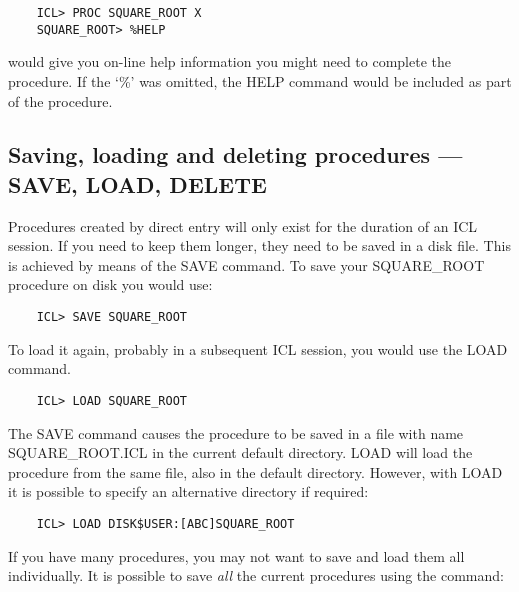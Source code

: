 \begin{small}
\begin{verbatim}
    ICL> PROC SQUARE_ROOT X
    SQUARE_ROOT> %HELP
\end{verbatim}
\end{small}

would give you on-line help information you might need to complete the
procedure.
If the `\%' was omitted, the HELP command would be included as part of the
procedure.

\subsection{Saving, loading and deleting procedures --- SAVE, LOAD, DELETE}

Procedures created by direct entry will only exist for the duration of an ICL
session.
If you need to keep them longer, they need to be saved in a disk file.
This is achieved by means of the SAVE command.
To save your SQUARE\_ROOT procedure on disk you would use:

\begin{small}
\begin{verbatim}
    ICL> SAVE SQUARE_ROOT
\end{verbatim}
\end{small}

To load it again, probably in a subsequent ICL session, you would use the LOAD
command.

\begin{small}
\begin{verbatim}
    ICL> LOAD SQUARE_ROOT
\end{verbatim}
\end{small}

The SAVE command causes the procedure to be saved in a file with name
SQUARE\_ROOT.ICL in the current default directory.
LOAD will load the procedure from the same file, also in the default directory.
However, with LOAD it is possible to specify an alternative directory if
required:

\begin{small}
\begin{verbatim}
    ICL> LOAD DISK$USER:[ABC]SQUARE_ROOT
\end{verbatim}
\end{small}

If you have many procedures, you may not want to save and load them all
individually.
It is possible to save {\em all} the current procedures using the command:

